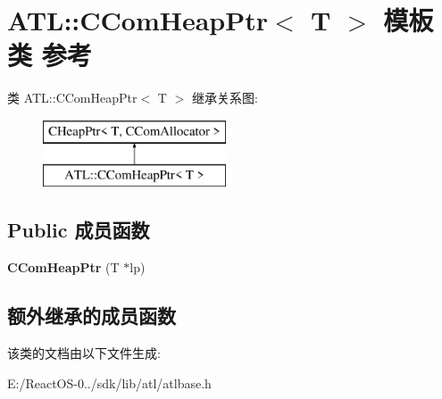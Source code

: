 \hypertarget{class_a_t_l_1_1_c_com_heap_ptr}{}\section{A\+TL\+:\+:C\+Com\+Heap\+Ptr$<$ T $>$ 模板类 参考}
\label{class_a_t_l_1_1_c_com_heap_ptr}
类 A\+TL\+:\+:C\+Com\+Heap\+Ptr$<$ T $>$ 继承关系图\+:\begin{figure}[H]
\begin{center}
\leavevmode
\includegraphics[height=2.000000cm]{class_a_t_l_1_1_c_com_heap_ptr}
\end{center}
\end{figure}
\subsection*{Public 成员函数}
\begin{DoxyCompactItemize}
\item 
\mbox{\label{class_a_t_l_1_1_c_com_heap_ptr_a893f5c199176991628c9945bbf0014a6}} 
{\bfseries C\+Com\+Heap\+Ptr} (T $\ast$lp)
\end{DoxyCompactItemize}
\subsection*{额外继承的成员函数}


该类的文档由以下文件生成\+:\begin{DoxyCompactItemize}
\item 
E\+:/\+React\+O\+S-\/0../sdk/lib/atl/atlbase.\+h\end{DoxyCompactItemize}
